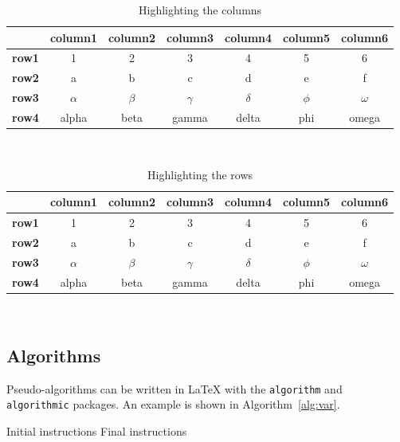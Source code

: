 \documentclass{Configuration_Files/PoliMi3i_thesis}
\begin{document}
\begin{table}[H]
\centering
    \begin{tabular}{|p{3em} | c | c | c | c | c | c|}
    \hline
     & \textbf{column1} & \textbf{column2} & \textbf{column3} & \textbf{column4} & \textbf{column5} & \textbf{column6} \T\B \\
    \hline \hline
    \textbf{row1} & 1 & 2 & 3 & 4 & 5 & 6 \T\B\\
    \textbf{row2} & a & b & c & d & e & f \T\B\\
    \textbf{row3} & $\alpha$ & $\beta$ & $\gamma$ & $\delta$ & $\phi$ & $\omega$ \T\B\\
    \textbf{row4} & alpha & beta & gamma & delta & phi & omega \B\\
    \hline
    \end{tabular}
    \\[10pt]
    \caption{Highlighting the columns}
    \label{table:exampleC}
\end{table}

\begin{table}[H]
\centering
    \begin{tabular}{|p{3em} c c c c c c|}
    \hline
     & \textbf{column1} & \textbf{column2} & \textbf{column3} & \textbf{column4} & \textbf{column5} & \textbf{column6} \T\B \\
    \hline \hline
    \textbf{row1} & 1 & 2 & 3 & 4 & 5 & 6 \T\B\\
    \hline
    \textbf{row2} & a & b & c & d & e & f \T\B\\
    \hline
    \textbf{row3} & $\alpha$ & $\beta$ & $\gamma$ & $\delta$ & $\phi$ & $\omega$ \T\B\\
    \hline
    \textbf{row4} & alpha & beta & gamma & delta & phi & omega \B\\
    \hline
    \end{tabular}
    \\[10pt]
    \caption{Highlighting the rows}
    \label{table:exampleR}
\end{table}

\subsection{Algorithms}
\label{subsec:algorithms}

Pseudo-algorithms can be written in \LaTeX{} with the \texttt{algorithm} and \texttt{algorithmic} packages.
An example is shown in Algorithm~\ref{alg:var}.
\begin{algorithm}[H]
    \label{alg:example}
    \caption{Name of the Algorithm}
    \label{alg:var}
    \label{protocol1}
    \begin{algorithmic}[1]
    \STATE Initial instructions
    \ENDIF
    \ENDFOR
    \ENDWHILE
    \STATE Final instructions
    \end{algorithmic}
\end{algorithm}
\end{document}
